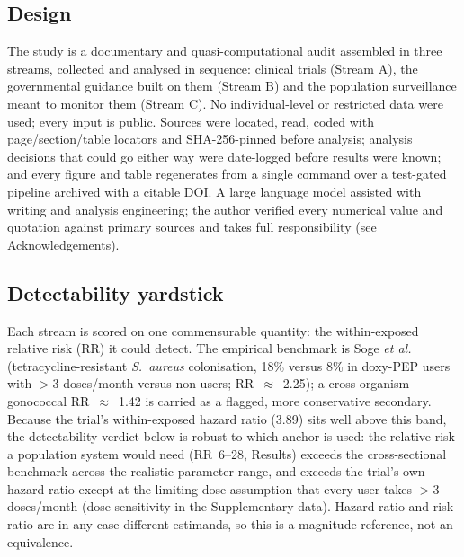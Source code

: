 \documentclass[12pt,a4paper]{article}
\newcommand{\sa}{\emph{S.~aureus}}
\begin{document}
\subsection*{Design}
The study is a documentary and quasi-computational audit assembled in three
streams, collected and analysed in sequence: clinical trials (Stream A), the
governmental guidance built on them (Stream B) and the population surveillance
meant to monitor them (Stream C). No individual-level or restricted data were
used; every input is public. Sources were
located, read, coded with page/section/table locators and SHA-256-pinned before
analysis; analysis decisions that could go either way were date-logged before
results were known; and every figure and table regenerates from a single command
over a test-gated pipeline archived with a citable
DOI.\cite{armond2024integrity} A large language model assisted with writing and
analysis engineering; the author verified every numerical value and quotation
against primary sources and takes full responsibility (see Acknowledgements).

\subsection*{Detectability yardstick}
Each stream is scored on one commensurable quantity: the within-exposed relative
risk (RR) it could detect. The empirical benchmark is Soge \textit{et
al.}\cite{soge2025} (tetracycline-resistant \sa{} colonisation, 18\% versus 8\%
in doxy-PEP users with $>$3 doses/month versus non-users; RR~$\approx$~2.25); a
cross-organism gonococcal RR~$\approx$~1.42 is carried as a flagged, more
conservative secondary. Because the trial's within-exposed hazard ratio (3.89)
sits well above this band, the detectability verdict below is robust to which
anchor is used: the relative risk a population system would need (RR~6--28,
Results) exceeds the cross-sectional benchmark across the realistic parameter
range, and exceeds the trial's own hazard ratio except at the limiting dose
assumption that every user takes $>$3 doses/month (dose-sensitivity in the
Supplementary data). Hazard ratio and risk ratio are in any case different
estimands, so this is a magnitude reference, not an equivalence.
\end{document}

